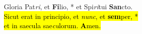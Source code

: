 Gloria Pat\emph{ri}, et \textbf{Fi}lio, *
 et Spi\emph{ri}tui \textbf{San}cto. \\
\hl{Sicut erat in principio, et \emph{nunc}, et \textbf{sem}per, *\\
et in saecula sae\emph{cu}lorum. \textbf{A}men.}
